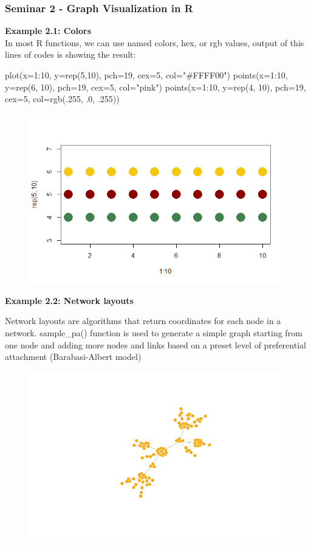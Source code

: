 \documentclass{beamer}
\begin{document}
\begin{frame}
\frametitle{Seminar 2 - Graph Visualization in R  }
\textbf{Example 2.1: Colors}\\
In most R functions, we can use named colors, hex, or rgb values, output of this lines of codes is showing the result:\newline

plot(x=1:10, y=rep(5,10), pch=19, cex=5, col="\#FFFF00")
points(x=1:10, y=rep(6, 10), pch=19, cex=5, col="pink")
points(x=1:10, y=rep(4, 10), pch=19, cex=5, col=rgb(.255, .0, .255))
\begin{figure}
\includegraphics[width=0.5\linewidth]{Seminar_2_images/R/b Graph Visualization.png}
\end{figure}
\end{frame}
\begin{frame}
\textbf{Example 2.2: Network layouts}\newline

Network layouts are algorithms that return coordinates for each node in a network.\newline
sample\_pa() function is used to generate a simple graph starting from one node and adding more nodes and links based on a preset level of preferential attachment (Barabasi-Albert model)
\begin{figure}
\includegraphics[width=0.8\linewidth]{Seminar_2_images/R/b network layout.png}
\end{figure}

\end{frame}
\end{document}
